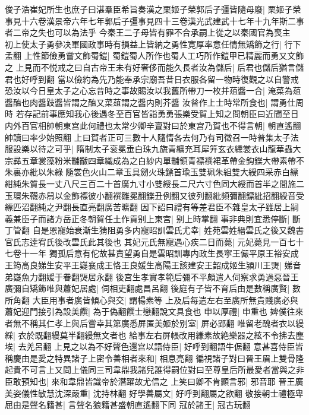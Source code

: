 俊子浩崔妃所生也庶子曰湛羣臣希旨奏漢之栗姬子榮郭后子彊皆隨母廢|{
	栗姬子榮事見十六卷漢景帝六年七年郭后子彊事見四十三卷漢光武建武十七年十九年斯二事者二帝之失也可以為法乎}
今秦王二子母皆有罪不合承嗣上從之以秦國官為喪主　初上使太子勇參决軍國政事時有損益上皆納之勇性寛厚率意任情無矯飾之行|{
	行下孟翻}
上性節儉勇嘗文飾蜀鎧|{
	蜀鎧蜀人所作也蜀人工巧所作鎧甲已精麗而勇又文飾之}
上見而不悦戒之曰自古帝王未有好奢侈而能久長者汝為儲后|{
	后君也儲后猶言儲君也好呼到翻}
當以儉約為先乃能奉承宗廟吾昔日衣服各留一物時復觀之以自警戒恐汝以今日皇太子之心忘昔時之事故賜汝以我舊所帶刀一枚并葅醬一合|{
	淹菜為葅醬醢也肉醬跂醬皆謂之醢又菜葅謂之醬内則芥醬}
汝㫺作上士時常所食也|{
	謂勇仕周時}
若存記前事應知我心後遇冬至百官皆詣勇勇張樂受賀上知之問朝臣曰近聞至日内外百官相帥朝東宫此何禮也太常少卿辛亶對曰於東宫乃賀也不得言朝|{
	朝直遙翻帥讀曰率少始照翻}
上曰賀者正可三數十人隨情各去何乃有司徵召一時普集太子法服設樂以待之可乎|{
	隋制太子衮冕垂白珠九旒青纊充耳犀笄玄衣纁裳衣山龍華蟲大宗彞五章裳藻粉米黼黻四章織成為之白紗内單黼領青褾襈裙革帶金鈎鍱大帶素帶不朱裏亦紕以朱綠隨裳色火山二章玉具劒火珠鏢首瑜玉雙珮朱組雙大綬四采赤白縹紺純朱質長一丈八尺三百二十首廣九寸小雙綬長二尺六寸色同大綬而首半之間施二玉環朱韈赤舄以金飾褾彼小翻襈雛冕翻鍱丑例翻又彼列翻紕頻彌翻鏢紕招翻綬音受縹匹沼翻純之尹翻長直亮翻廣苦曠翻}
因下詔曰禮有等差君臣不雜皇太子雖居上嗣義兼臣子而諸方岳正冬朝賀任土作貢别上東宫|{
	别上時掌翻}
事非典則宜悉停斷|{
	斷丁管翻}
自是恩寵始衰漸生猜阻勇多内寵昭訓雲氏尤幸|{
	姓苑雲姓縉雲氏之後又魏書官氏志逹宥氏後改雲氏此其後也}
其妃元氏無寵遇心疾二日而薨|{
	元妃薨見一百七十七卷十一年}
獨孤后意有佗故甚責望勇自是雲昭訓專内政生長寜王儼平原王裕安成王筠高良娣生安平王嶷襄成王恪王良媛生高陽王該建安王韶成姬生潁川王煚|{
	娣音弟嶷魚力翻媛于眷翻煚居永翻}
後宫生孝實孝範后彌不平頗遣人伺察求勇過惡晉王廣彌自矯飾唯與蕭妃居處|{
	伺相吏翻處昌呂翻}
後庭有子皆不育后由是數稱廣賢|{
	數所角翻}
大臣用事者廣皆傾心與交|{
	謂楊素等}
上及后每遣左右至廣所無貴賤廣必與蕭妃迎門接引為設美饌|{
	為于偽翻饌士戀翻說文具食也}
申以厚禮|{
	申重也}
婢僕往來者無不稱其仁孝上與后嘗幸其第廣悉屏匿美姬於别室|{
	屏必郢翻}
唯留老醜者衣以縵綵|{
	衣於既翻縵莫半翻縵無文者也}
給事左右屏帳改用縑素故絶樂器之絃不令拂去塵埃|{
	去羌呂翻}
上見之以為不好聲色還宫以語侍臣|{
	好呼到翻語牛倨翻}
意甚喜侍臣皆稱慶由是愛之特異諸子上密令善相者來和|{
	相息亮翻}
徧視諸子對曰晉王眉上雙骨隆起貴不可言上又問上儀同三司韋鼎我諸兒誰得嗣位對曰至尊皇后所最愛者當與之非臣敢預知也|{
	來和韋鼎皆識帝於潛躍故尤信之}
上笑曰卿不肯顯言邪|{
	邪音耶}
晉王廣美姿儀性敏慧沈深嚴重|{
	沈持林翻}
好學善屬文|{
	好呼到翻屬之欲翻}
敬接朝士禮極卑屈由是聲名籍甚|{
	言聲名狼籍甚盛朝直遙翻下同}
冠於諸王|{
	冠古玩翻}
